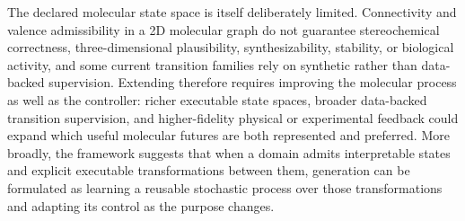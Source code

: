 The declared molecular state space is itself deliberately limited. Connectivity and valence admissibility in a 2D molecular graph do not guarantee stereochemical correctness, three-dimensional plausibility, synthesizability, stability, or biological activity, and some current transition families rely on synthetic rather than data-backed supervision. Extending \method{} therefore requires improving the molecular process as well as the controller: richer executable state spaces, broader data-backed transition supervision, and higher-fidelity physical or experimental feedback could expand which useful molecular futures are both represented and preferred. More broadly, the framework suggests that when a domain admits interpretable states and explicit executable transformations between them, generation can be formulated as learning a reusable stochastic process over those transformations and adapting its control as the purpose changes.
